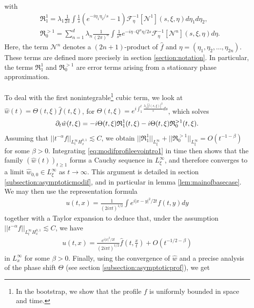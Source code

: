 \documentclass[a4paper, 15pt]{article}
\numberwithin{equation}{section}
\begin{document}
with 
\begin{align*}
    &\mathfrak{R}^1_1=\lambda_1\frac{1}{2\pi}\int\frac{1}{s}(e^{-i\eta_1\eta_2/s}-1)\mathcal{F}^{-1}_{\eta}[\mathcal{N}^1](s,\xi,\eta)d\eta_1d\eta_2,\\&\mathfrak{R}^{>1}_0=\sum^d_{n=1}\lambda_n\frac{1}{(2\pi)^n}\int\frac{1}{s^n}e^{-i\eta \cdot Q^n\eta/2s}\mathcal{F}^{-1}_{\eta}[\mathcal{N}^n](s,\xi,\eta)d\eta.
\end{align*}
Here, the term $\mathcal{N}^n$ denotes a $(2n+1)$-product of $\hat{f}$ and $\eta=(\eta_1,\eta_2,\dots,\eta_{2n})$. These terms are defined more precisely in section \ref{section:notation}. In particular, the terms $\mathfrak{R}^1_1$ and $\mathfrak{R}^{>1}_0$ are error terms arising from a stationary phase approximation.\\\\
To deal with the first nonintegrable\footnote{In the bootstrap, we show that the profile $f$ is uniformly bounded in space and time.} cubic term, we look at $\hat{w}(t)=\Theta(t,\xi)\hat{f}(t,\xi)$, for $\Theta(t,\xi)=e^{i\int^t_1\frac{\lambda_1|\hat{f}(s,\xi)|^2}{s}ds}$, which solves 
\begin{equation}
\label{eq:modifprofileevointro1}
    \partial_t\hat{w}(t,\xi)=-i\Theta(t,\xi)\mathfrak{R}^1_1(t,\xi)-i\Theta(t,\xi)\mathfrak{R}^{>1}_0(t,\xi).\\
\end{equation}
Assuming that $||t^{-\alpha}f||_{L^\infty_t H^{0,1}_x}\lesssim C$, we obtain $||\mathfrak{R}^1_1||_{L^\infty_\xi}+||\mathfrak{R}^{>1}_0||_{L^\infty_\xi}=O(t^{-1-\beta})$ for some $\beta>0$. Integrating \eqref{eq:modifprofileevointro1} in time then shows that the family $(\hat{w}(t))_{t\geq1}$ 
 forms a Cauchy sequence in $L^\infty_\xi$, and therefore converges to a limit $\hat{w}_{0,0}\in L^\infty_\xi$ as $t\to\infty$. This argument is detailed in section \ref{subsection:asymptoticmodif}, and in particular in lemma \ref{lem:mainofbasecase}. We may then use the representation formula 
\begin{align}
\label{eq:trickformulauf}
u(t,x)=\frac{1}{(2i\pi t)^{1/2}}\int e^{i|x-y|^2/2t}f(t,y)dy
\end{align}
together with a Taylor expansion to deduce that, under the assumption $||t^{-\alpha}f||_{L^\infty_t H^{0,1}_x}\lesssim C$, we have
  \begin{align}
u(t,x)=\frac{e^{i|x|^2/2t}}{(2i\pi t)^{1/2}}\hat{f}\left(t,\frac{x}{t}\right)+O(t^{-1/2-\beta})
\end{align}
in $L^\infty_x$ for some $\beta>0$. Finally, using the convergence of $\hat{w}$ and a precise analysis of the phase shift $\Theta$ (see section \ref{subsection:asymptoticprof}), we get 
\end{document}
